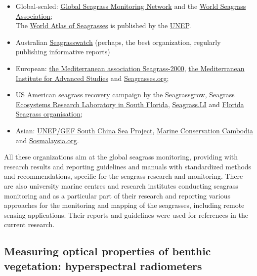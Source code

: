 \documentclass[11pt]{article}
\begin{document}
\begin{itemize}
	\item Global-scaled: \href{http://www.seagrassnet.org/}{Global Seagrass Monitoring Network} and the \href{http://wsa.seagrassonline.org/}{World Seagrass Association}; \\ The \href{http://www.unep-wcmc.org/marine/seagrassatlas/contents.htm}{World Atlas of Seagrasses} is published by the \href{http://www.unep.org/}{UNEP}.
	\item Australian \href{http://www.seagrasswatch.org/}{Seagrasswatch} (perhaps, the best organization, regularly publishing informative reports)
	\item European: \href{http://mediterranean.seagrassonline.org/}{the Mediterranean association Seagrass-2000}, \href{http://www.imedea.uib.es/index.php}{the Mediterranean Institute for Advanced Studies} and \href{http://www.seagrasses.org/}{Seagrasses.org};
	\item  US American \href{http://www.columbia.com/Seagrass-Recovery/About_Us_Giving_Back_Seagrass,default,pg.html}{seagrass recovery campaign} by the \href{http://www.seagrassgrow.org/}{Seagrassgrow}, \href{http://www2.fiu.edu/~seagrass/}{Seagrass Ecosystems Research Laboratory in South Florida}, \href{http://counties.cce.cornell.edu/suffolk/habitat_restoration/seagrassli/index.html}{Seagrass.LI} and
\href{http://www.flseagrass.org/}{Florida Seagrass organisation}; 
	\item Asian: \href{http://www.unepscs.org/}{UNEP/GEF South China Sea Project}, \href{http://www.marineconservationcambodia.org/Marine-Species-Photographic-Database/Cambodian-Marine-Life/Cambodian-Marine-Plants/Seagrasses.html}{Marine Conservation Cambodia} and \href{http://www.sosmalaysia.org/home.html}{Sosmalaysia.org}.
\end{itemize}
All these organizations aim at the global seagrass monitoring, providing with
research results and reporting guidelines and manuals with standardized methods and
recommendations, specific for the seagrass research and monitoring. There are also university marine
centres and research institutes conducting seagrass monitoring and as a particular part of their
research and reporting various approaches for the monitoring and mapping of the seagrasses, including remote
sensing applications. Their reports and guidelines were used for references in the current research. 


\subsection[Measuring optical properties of benthic vegetation: hyperspectral radiometers]{Measuring optical properties of benthic vegetation: hyperspectral radiometers%
}
\label{sec:2-2}\label{page-12}
\end{document}

